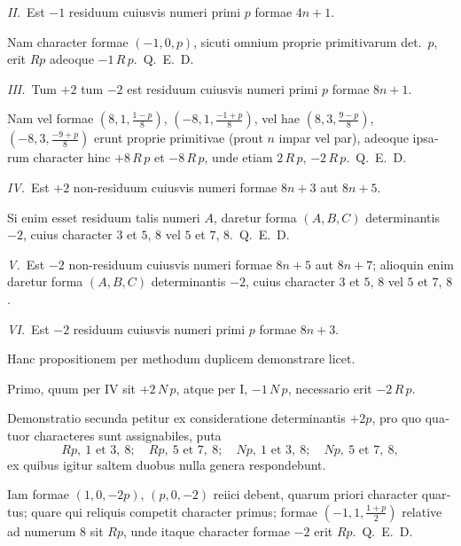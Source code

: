 \documentclass[12pt,a4paper]{article}
\theoremstyle{plain}
\theoremstyle{definition}
\theoremstyle{remark}
\begin{document}
\begin{otherlanguage}{latin}
\smallskip

\textit{II.}\ Est $-1$ residuum cuiusvis numeri primi $p$ formae $4n+1$.

Nam character formae $(-1, 0, p)$, sicuti omnium proprie primitivarum det.\ $p$, erit $Rp$ adeoque $-1 \, R \, p$.~\hfill Q.\ E.\ D.

\smallskip

\textit{III.}\ Tum $+2$ tum $-2$ est residuum cuiusvis numeri primi $p$ formae $8n+1$.

Nam vel formae $(8, 1, \frac{1-p}{8})$, $(-8, 1, \frac{-1+p}{8})$, vel hae $(8, 3, \frac{9-p}{8})$, $(-8, 3, \frac{-9+p}{8})$ erunt proprie primitivae (prout $n$ impar vel par), adeoque ipsarum character hinc $+8 \, R \, p$ et $-8 \, R \, p$, unde etiam $2 \, R \, p$, $-2 \, R \, p$.~\hfill Q.\ E.\ D.

\smallskip

\textit{IV.}\ Est $+2$ non-residuum cuiusvis numeri formae $8n+3$ aut $8n+5$.

Si enim esset residuum talis numeri $A$, daretur forma $(A, B, C)$ determinantis $-2$, cuius character $3$ et $5$, $8$ vel $5$ et $7$, $8$.~\hfill Q.\ E.\ D.

\smallskip

\textit{V.}\ Est $-2$ non-residuum cuiusvis numeri formae $8n+5$ aut $8n+7$; alioquin enim daretur forma $(A, B, C)$ determinantis $-2$, cuius character $3$ et $5$, $8$ vel $5$ et $7$, $8$.

\smallskip

\textit{VI.}\ Est $-2$ residuum cuiusvis numeri primi $p$ formae $8n+3$.

Hanc propositionem per methodum duplicem demonstrare licet.

Primo, quum per IV sit $+2 \, N \, p$, atque per I, $-1 \, N \, p$, necessario erit $-2 \, R \, p$.

Demonstratio secunda petitur ex consideratione determinantis $+2p$, pro quo quatuor characteres sunt assignabiles, puta
\[
Rp, \ 1 \text{ et } 3,\ 8; \quad Rp, \ 5 \text{ et } 7,\ 8; \quad Np, \ 1 \text{ et } 3,\ 8; \quad Np, \ 5 \text{ et } 7,\ 8,
\]
ex quibus igitur saltem duobus nulla genera respondebunt.

Iam formae $(1, 0, -2p)$, $(p, 0, -2)$ reiici debent, quarum priori character quartus; quare qui reliquis competit character primus; formae $(-1, 1, \frac{1+p}{2})$ relative ad numerum $8$ sit $Rp$, unde itaque character formae $-2$ erit $Rp$.~\hfill Q.\ E.\ D.

\smallskip


\end{otherlanguage}
\end{document}
